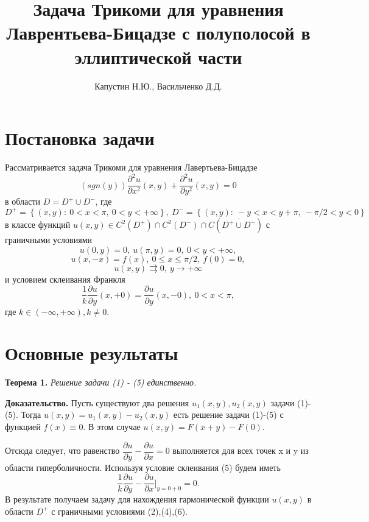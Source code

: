 \documentclass[9pt]{article}
\title{Задача Трикоми для уравнения Лаврентьева-Бицадзе с полуполосой в эллиптической части}
\author{Капустин Н.Ю., Васильченко Д.Д.}
\begin{document}
	\maketitle
	\section{Постановка задачи}
	
	Рассматривается задача Трикоми для уравнения Лавертьева-Бицадзе
	\begin{equation}
		\left(sgn (y)\right) \dfrac{\partial^2 u}{\partial x^2}(x,y) + \dfrac{\partial^2 u}{\partial y^2}(x,y) = 0
	\end{equation}
	в области $D = D^{+} \cup D^{-}$, где $D^{+} = \left\{(x,y): \ 0 < x < \pi, \ 0 < y < + \infty \right\}, \ D^{-} = \left\{(x,y): \ -y < x < y + \pi, \ -\pi/2 < y < 0\right\}$ в классе функций $u(x,y) \in C^2(D^{+}) \cap C^2(D^{-}) \cap C(\overline{D^{+} \cup D^{-}})$ с граничными условиями
	\begin{equation}
		u(0,y) = 0, \ u(\pi, y) = 0, \ 0 < y < + \infty,
	\end{equation}
	\begin{equation}
		u(x,-x) = f(x) , \ 0 \leq x \leq \pi/2, \ f(0) = 0, 
	\end{equation}
	\begin{equation}
		u(x,y) \rightrightarrows 0, \ y \to +\infty
	\end{equation}
	и условием склеивания Франкля 
	\begin{equation}
		\dfrac1{k} \dfrac{\partial u}{\partial y}(x, +0) = \dfrac{\partial u}{\partial y} (x, -0), \ 0 < x < \pi, 
	\end{equation}
	где $k \in (-\infty, +\infty), k \neq 0$.
	\section{Основные результаты}
		\textbf{Теорема 1.} \textit{Решение задачи (1) - (5) единственно.}
		
	\textbf{Доказательство.} 
	Пусть существуют два решения $u_1(x,y), u_2(x,y)$ задачи (1)-(5). Тогда $u(x,y) = u_1(x,y) - u_2(x,y)$ есть решение задачи (1)-(5) с функцией $f(x) \equiv 0$. В этом случае $u(x,y) = F(x+y) - F(0)$.
	
	Отсюда следует, что равенство $\dfrac{\partial u}{\partial y} - \dfrac{\partial u}{\partial x} = 0$ выполняется для всех точек x и y из области гиперболичности. Используя условие склеивания  (5) будем иметь
	\begin{equation}
		\dfrac1{k} \dfrac{\partial u}{\partial y} - \dfrac{\partial u}{\partial x}\vert_{y=0+0} = 0.
	\end{equation}
	В результате получаем задачу для нахождения гармонической функции $u(x,y)$ в области $D^{+}$ с граничными условиями (2),(4),(6).
	
\end{document}
